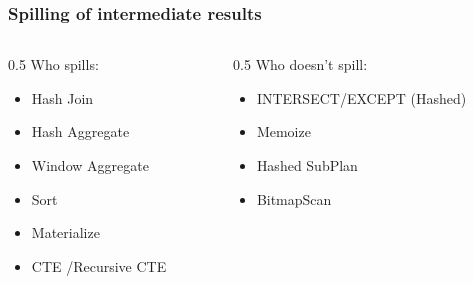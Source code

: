 \documentclass{beamer}
\begin{document}
\begin{frame}\frametitle{Spilling of intermediate results}
  \vspace*{\fill}
  \begin{columns}[T,onlytextwidth]
    \begin{column}{0.5\textwidth}
      {\large\color{ptoink}Who spills:}\medskip
      {\small\color{ptoink}
        \begin{itemize}\itemsep4pt
          \item Hash Join
          \item Hash Aggregate
          \item Window Aggregate
          \item Sort
          \item Materialize
          \item CTE /Recursive CTE
        \end{itemize}
      }
  \end{column}
    
    \begin{column}{0.5\textwidth}
       {\large\color{ptoink}Who doesn't spill:}\medskip
      {\small\color{ptoink}
        \begin{itemize}\itemsep4pt
          \item INTERSECT/EXCEPT (Hashed)
          \item Memoize
          \item Hashed SubPlan
          \item BitmapScan
        \end{itemize}
      }
    \end{column}
  \end{columns}
  \vspace*{\fill}
\end{frame}

\end{document}
